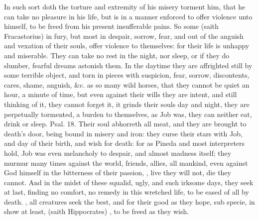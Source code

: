 In such sort doth the torture and extremity of his misery torment him,
that he can take no pleasure in his life, but is in a manner enforced
to offer violence unto himself, to be freed from his present
insufferable pains. So some (saith Fracastorius) in fury, but
most in despair, sorrow, fear, and out of the anguish and vexation of
their souls, offer violence to themselves: for their life is unhappy
and miserable. They can take no rest in the night, nor sleep, or if
they do slumber, fearful dreams astonish them. In the daytime they are
affrighted still by some terrible object, and torn in pieces with
suspicion, fear, sorrow, discontents, cares, shame, anguish, \&c. as so
many wild horses, that they cannot be quiet an hour, a minute of time,
but even against their wills they are intent, and still thinking of it,
they cannot forget it, it grinds their souls day and night, they are
perpetually tormented, a burden to themselves, as Job was, they can
neither eat, drink or sleep. Psal.  18. Their soul abhorreth all
meat, and they are brought to death's door, being bound in misery
and iron: they curse their stars with Job, and day of their
birth, and wish for death: for as Pineda and most interpreters hold,
Job was even melancholy to despair, and almost madness itself;
they murmur many times against the world, friends, allies, all mankind,
even against God himself in the bitterness of their passion,
, live they will not, die they
cannot. And in the midst of these squalid, ugly, and such irksome days,
they seek at last, finding no comfort, no remedy in this wretched
life, to be eased of all by death. , all creatures
seek the best, and for their good as they hope, sub specie, in show at
least,  (saith Hippocrates) , to be freed as they wish.

